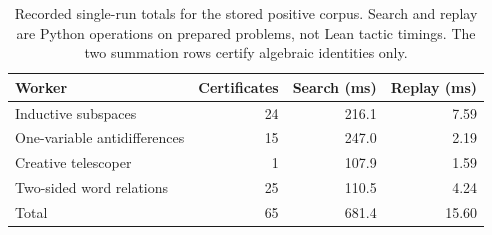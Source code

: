 \begin{table}[htbp]\centering
\small
\begin{tabular}{@{}lrrr@{}}
\toprule
Worker & Certificates & Search (ms) & Replay (ms)\\
\midrule
Inductive subspaces & 24 & 216.1 & 7.59\\
One-variable antidifferences & 15 & 247.0 & 2.19\\
Creative telescoper & 1 & 107.9 & 1.59\\
Two-sided word relations & 25 & 110.5 & 4.24\\
\midrule
Total & 65 & 681.4 & 15.60\\
\bottomrule
\end{tabular}
\caption{Recorded single-run totals for the stored positive corpus. Search and replay are Python operations on prepared problems, not Lean tactic timings. The two summation rows certify algebraic identities only.}
\label{tab:timing}
\end{table}
